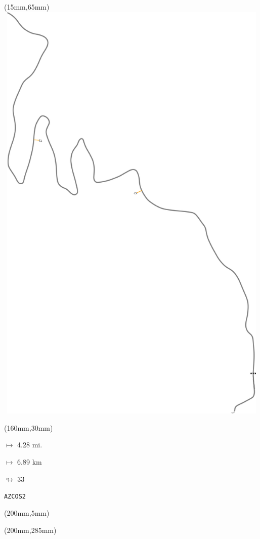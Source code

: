 \begin{textblock*}{185mm}(15mm,65mm)%
\centering
\mbox{\includegraphics[width=185mm,height=210mm,keepaspectratio]{PT/AZCOS2.pdf}}
\end{textblock*}
\begin{textblock*}{40mm}(160mm,30mm)%
\Large
\par$\mapsto$ 4.28 mi.
\par$\mapsto$ 6.89 km
\par$\looparrowright$ 33
\par\hfill\tiny\tt AZCOS2\\
\end{textblock*}
\begin{textblock*}{20mm}(200mm,5mm)%
\fbox{\thepage}
\label{AZCOS2}
\end{textblock*}
\begin{textblock*}{20mm}(200mm,285mm)%
\fbox{\thepage}
\end{textblock*}

